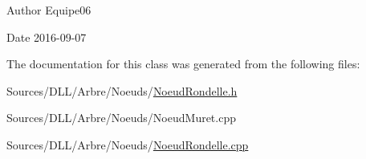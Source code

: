 \begin{DoxyAuthor}{Author}
Equipe06 
\end{DoxyAuthor}
\begin{DoxyDate}{Date}
2016-\/09-\/07 
\end{DoxyDate}


The documentation for this class was generated from the following files\+:\begin{DoxyCompactItemize}
\item 
Sources/\+D\+L\+L/\+Arbre/\+Noeuds/\hyperlink{_noeud_rondelle_8h}{Noeud\+Rondelle.\+h}\item 
Sources/\+D\+L\+L/\+Arbre/\+Noeuds/Noeud\+Muret.\+cpp\item 
Sources/\+D\+L\+L/\+Arbre/\+Noeuds/\hyperlink{_noeud_rondelle_8cpp}{Noeud\+Rondelle.\+cpp}\end{DoxyCompactItemize}
